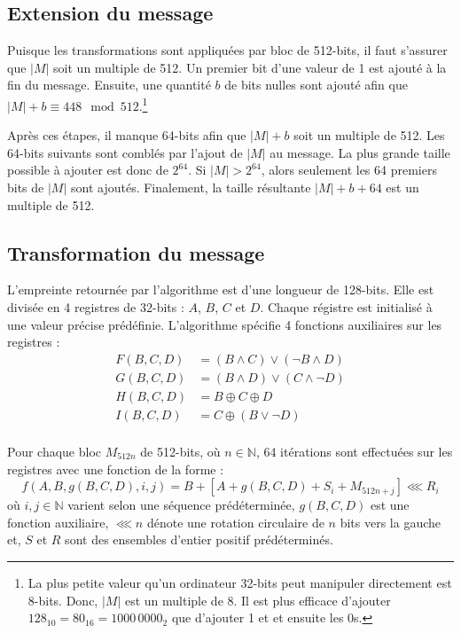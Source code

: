 \documentclass[11pt]{article}
\begin{document}
\subsection{Extension du message}
Puisque les transformations sont appliquées par bloc de 512-bits, il faut s'assurer que $|M|$ soit un multiple de 512. Un premier bit d'une valeur de 1 est ajouté à la fin du message. Ensuite, une quantité $b$ de bits nulles sont ajouté afin que $|M|+b\equiv448\mod512$.\footnote{La plus petite valeur qu'un ordinateur 32-bits peut manipuler directement est 8-bits. Donc, $|M|$ est un multiple de 8. Il est plus efficace d'ajouter $128_{10}=80_{16}=1000\,0000_{2}$ que d'ajouter 1 et et ensuite les 0s.}

\begin{figure}[H]
  \centering
  
\end{figure}

Après ces étapes, il manque 64-bits afin que $|M|+b$ soit un multiple de 512. Les 64-bits suivants sont comblés par l'ajout de $|M|$ au message. La plus grande taille possible à ajouter est donc de $2^{64}$. Si $|M|>2^{64}$, alors seulement les 64 premiers bits de $|M|$ sont ajoutés. Finalement, la taille résultante $|M|+b+64$ est un multiple de 512.

\begin{figure}[H]
  \centering
  
\end{figure}

\subsection{Transformation du message}
L'empreinte retournée par l'algorithme est d'une longueur de 128-bits. Elle est divisée en 4 registres de 32-bits : $A$, $B$, $C$ et $D$. Chaque régistre est initialisé à une valeur précise prédéfinie. L'algorithme spécifie 4 fonctions auxiliaires sur les registres :
\begin{equation*}
\begin{split}
F(B, C, D)&=(B\wedge C)\vee(\neg B\wedge D)\\
G(B, C, D)&=(B\wedge D)\vee(C\wedge\neg D)\\
H(B, C, D)&=B\oplus C\oplus D\\
I(B, C, D)&=C\oplus (B\vee\neg D)\\
\end{split}
\end{equation*}

Pour chaque bloc $M_{512n}$ de 512-bits, où $n\in\mathds{N}$, 64 itérations sont effectuées sur les registres avec une fonction de la forme :
\begin{equation*}
f(A, B, g(B, C, D), i, j)=B+[A+g(B, C, D)+S_{i}+M_{512n+j}]\lll R_{i}
\end{equation*}
où $i,j\in\mathds{N}$ varient selon une séquence prédéterminée, $g(B, C, D)$ est une fonction auxiliaire, $\lll n$ dénote une rotation circulaire de $n$ bits vers la gauche et, $S$ et $R$ sont des ensembles d'entier positif prédéterminés.
\end{document}
